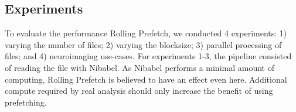 \documentclass[conference]{IEEEtran}
\begin{document}



\subsection{Experiments}
To evaluate the performance Rolling Prefetch, we conducted 4 experiments: 1) varying
the number of files; 2) varying the blocksize; 3) parallel processing of files;  and 4) neuroimaging use-cases.
For experiments 1-3, the pipeline consisted of reading the file with Nibabel. As Nibabel
performs a minimal amount of computing, Rolling Prefetch is believed to have an effect even here. Additional compute required
by real analysis should only increase the benefit of using prefetching.
\end{document}
